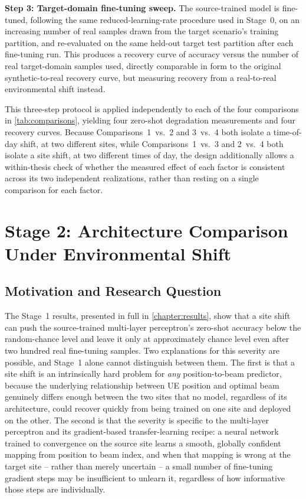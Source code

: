\documentclass{iutbscthesis}
\begin{document}
\textbf{Step 3: Target-domain fine-tuning sweep.} The source-trained model is fine-tuned, following the same reduced-learning-rate procedure used in Stage~0, on an increasing number of real samples drawn from the target scenario's training partition, and re-evaluated on the same held-out target test partition after each fine-tuning run. This produces a recovery curve of accuracy versus the number of real target-domain samples used, directly comparable in form to the original synthetic-to-real recovery curve, but measuring recovery from a real-to-real environmental shift instead.

This three-step protocol is applied independently to each of the four comparisons in \autoref{tab:comparisons}, yielding four zero-shot degradation measurements and four recovery curves. Because Comparisons~1~vs.~2 and 3~vs.~4 both isolate a time-of-day shift, at two different sites, while Comparisons~1~vs.~3 and 2~vs.~4 both isolate a site shift, at two different times of day, the design additionally allows a within-thesis check of whether the measured effect of each factor is consistent across its two independent realizations, rather than resting on a single comparison for each factor.

\section{Stage 2: Architecture Comparison Under Environmental Shift}
\label{sec:stage2}

\subsection{Motivation and Research Question}

The Stage~1 results, presented in full in \autoref{chapter:results}, show that a site shift can push the source-trained multi-layer perceptron's zero-shot accuracy below the random-chance level and leave it only at approximately chance level even after two hundred real fine-tuning samples. Two explanations for this severity are possible, and Stage~1 alone cannot distinguish between them. The first is that a site shift is an intrinsically hard problem for \emph{any} position-to-beam predictor, because the underlying relationship between UE position and optimal beam genuinely differs enough between the two sites that no model, regardless of its architecture, could recover quickly from being trained on one site and deployed on the other. The second is that the severity is specific to the multi-layer perceptron and its gradient-based transfer-learning recipe: a neural network trained to convergence on the source site learns a smooth, globally confident mapping from position to beam index, and when that mapping is wrong at the target site -- rather than merely uncertain -- a small number of fine-tuning gradient steps may be insufficient to unlearn it, regardless of how informative those steps are individually.
\end{document}
